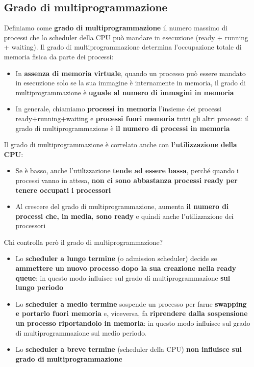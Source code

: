 \documentclass[12pt]{article}
\begin{document}
\subsection{Grado di multiprogrammazione}
Definiamo come \textbf{grado di multiprogrammazione} il numero massimo di processi che lo scheduler della CPU può mandare in esecuzione (ready + running + waiting).
Il grado di multiprogrammazione determina l'occupazione totale di memoria fisica da parte dei processi:
\begin{itemize}
    \item In \textbf{assenza di memoria virtuale}, quando un processo può essere mandato in esecuzione solo se la sua immagine è internamente in memoria, il grado di multiprogrammazione è \textbf{uguale al numero di immagini in memoria}
    \item In generale, chiamiamo \textbf{processi in memoria} l'insieme dei processi ready+running+waiting e \textbf{processi fuori memoria} tutti gli altri processi: il grado di multiprogrammazione è \textbf{il numero di processi in memoria}
\end{itemize}
Il grado di multiprogrammazione è correlato anche con \textbf{l'utilizzazione della CPU}:
\begin{itemize}
    \item Se è basso, anche l'utilizzazione \textbf{tende ad essere bassa}, perché quando i processi vanno in attesa, \textbf{non ci sono abbastanza processi ready per tenere occupati i processori}
    \item Al crescere del grado di multiprogrammazione, aumenta \textbf{il numero di processi che, in media, sono ready} e quindi anche l'utilizzazione dei processori
\end{itemize}
Chi controlla però il grado di multiprogrammazione?
\begin{itemize}
    \item Lo \textbf{scheduler a lungo termine} (o admission scheduler) decide se \textbf{ammettere un nuovo processo dopo la sua creazione nella ready queue}: in questo modo influisce sul grado di multiprogrammazione \textbf{sul lungo periodo}
    \item Lo \textbf{scheduler a medio termine} sospende un processo per farne \textbf{swapping e portarlo fuori memoria} e, viceversa, fa \textbf{riprendere dalla sospensione un processo riportandolo in memoria}: in questo modo influisce sul grado di multiprogrammazione sul medio periodo.
    \item Lo \textbf{scheduler a breve termine} (scheduler della CPU) \textbf{non influisce sul grado di multiprogrammazione}
\end{itemize}
\end{document}
